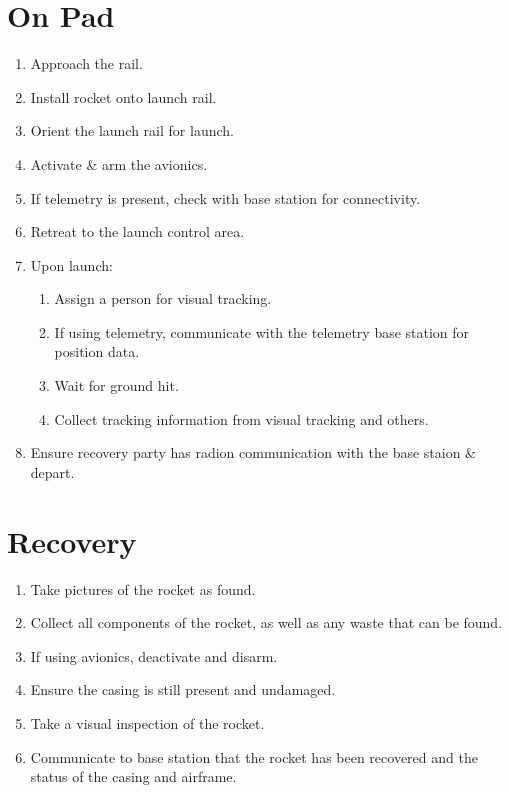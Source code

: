 \documentclass[12pt]{article}
\begin{document}
\section{On Pad}
\begin{addmargin}[3em]{3em}
	\begin{enumerate}[label=\thesection.\arabic*\quad$\square$]
		\item Approach the rail.
		\item Install rocket onto launch rail.
		\item Orient the launch rail for launch.
		\item Activate \& arm the avionics.
		\item If telemetry is present, check with base station for connectivity.
		\item Retreat to the launch control area.
		\item Upon launch:
		\begin{enumerate} [label=\thesection.\arabic{enumi}.\arabic*\quad$\square$]
			\item Assign a person for visual tracking.
			\item If using telemetry, communicate with the telemetry base station for position data.
			\item Wait for ground hit.
			\item Collect tracking information from visual tracking and others.
		\end{enumerate}
		\item Ensure recovery party has radion communication with the base staion \& depart. 
	\end{enumerate}
\end{addmargin}
\section{Recovery}
\begin{addmargin}[3em]{3em}
	\begin{enumerate}[label=\thesection.\arabic*\quad$\square$]
		\item Take pictures of the rocket as found.
		\item Collect all components of the rocket, as well as any waste that can be found.
		\item If using avionics, deactivate and disarm.
		\item Ensure the casing is still present and undamaged.
		\item Take a visual inspection of the rocket.
		\item Communicate to base station that the rocket has been recovered and the status of the casing and airframe.
	\end{enumerate}
\end{addmargin}
\end{document}
